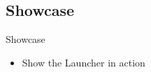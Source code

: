 \subsection{Showcase}
\begin{frame}{Showcase}
\begin{itemize}
  \item Show the Launcher in action
\end{itemize}
\end{frame}
